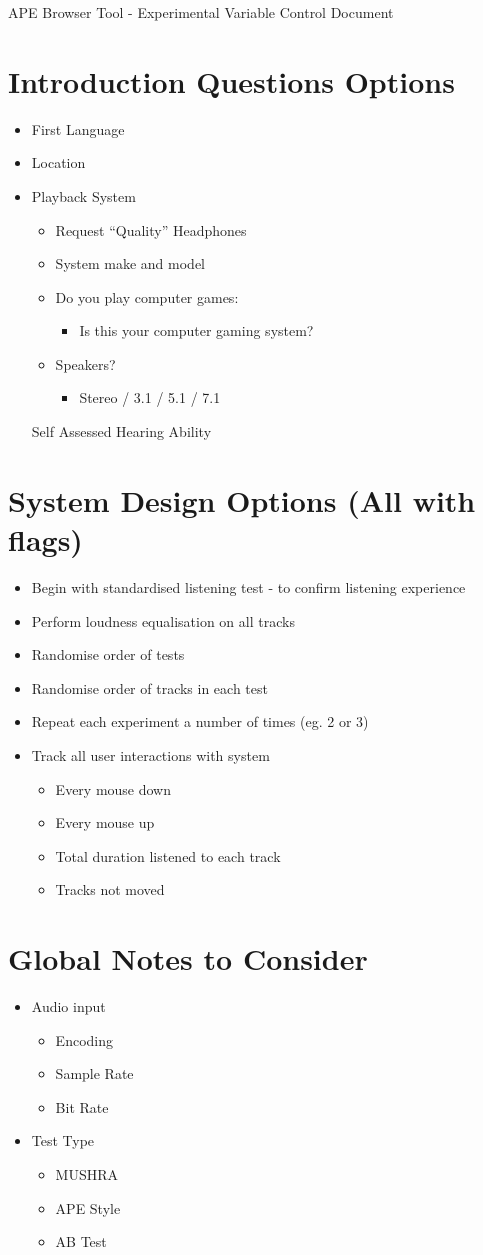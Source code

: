 \documentclass{article}
\begin{document}
{\large APE Browser Tool - Experimental Variable Control Document}


\section{Introduction Questions Options}
\begin{itemize}
\item First Language
\item Location
\item Playback System
\begin{itemize}
\item Request ``Quality'' Headphones
\item System make and model
\item Do you play computer games:
\begin{itemize}
\item Is this your computer gaming system?
\end{itemize}
\item Speakers?
\begin{itemize}
\item Stereo / 3.1 / 5.1 / 7.1
\end{itemize}
\end{itemize}
Self Assessed Hearing Ability
\end{itemize}


\section{System Design Options (All with flags)}
\begin{itemize}
\item Begin with standardised listening test - to confirm listening experience
\item Perform loudness equalisation on all tracks
\item Randomise order of tests
\item Randomise order of tracks in each test
\item Repeat each experiment a number of times (eg. 2 or 3)
\item Track all user interactions with system
\begin{itemize}
\item Every mouse down
\item Every mouse up
\item Total duration listened to each track
\item Tracks not moved	
\end{itemize}
\end{itemize}

\section{Global Notes to Consider}
\begin{itemize}
\item Audio input
\begin{itemize}
\item Encoding
\item Sample Rate
\item Bit Rate
\end{itemize}
\item Test Type
\begin{itemize}
\item MUSHRA
\item APE Style
\item AB Test
\end{itemize}
\end{itemize}
\end{document}
